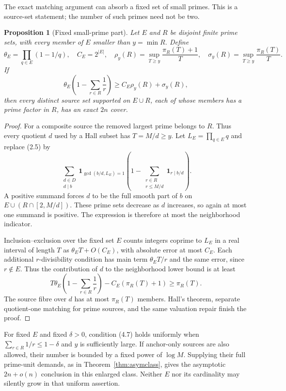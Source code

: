 \documentclass[11pt,a4paper]{article}
\newtheorem{proposition}[theorem]{Proposition}
\theoremstyle{remark}
\newcommand{\ind}{\mathbf 1}
\begin{document}
The exact matching argument can absorb a fixed set of small primes.
This is a source-set statement; the number of such primes need not
be two.

\begin{proposition}[Fixed small-prime part]
\label{prop:fixedanchors}
Let \(E\) and \(R\) be disjoint finite prime sets, with every member
of \(E\) smaller than \(y=\min R\). Define
\[
 \theta_E=\prod_{q\in E}(1-1/q),\quad C_E=2^{|E|},\quad
 \rho_y(R)=\sup_{T\ge y}\frac{\pi_R(T)+1}{T},\quad
 \sigma_y(R)=\sup_{T\ge y}\frac{\pi_R(T)}{T}.
 \]
If
\[
 \theta_E\left(1-\sum_{r\in R}\frac1r\right)
 \ge C_E\rho_y(R)+\sigma_y(R),
 \tag{4.7}
\]
then every distinct source set supported on \(E\cup R\), each of whose
members has a prime factor in \(R\), has an exact \(2n\) cover.
\end{proposition}
\begin{proof}
For a composite source the removed largest prime belongs to \(R\).
Thus every quotient \(d\) used by a Hall subset has \(T=M/d\ge y\).
Let \(L_E=\prod_{q\in E}q\) and replace (2.5) by
\[
 \sum_{\substack{d\in D\\d\mid b}}
 \ind_{\gcd(b/d,L_E)=1}
 \left(1-\sum_{\substack{r\in R\\r\le M/d}}\ind_{r\mid b/d}\right).
 \tag{4.8}
\]
A positive summand forces \(d\) to be the full smooth part of \(b\)
on \(E\cup(R\cap[2,M/d])\). These prime sets decrease as \(d\)
increases, so again at most one summand is positive.
The expression is therefore at most the neighborhood indicator.

Inclusion--exclusion over the fixed set \(E\) counts integers
coprime to \(L_E\) in a real interval of length \(T\) as
\(\theta_ET+O(C_E)\), with absolute error at most \(C_E\).
Each additional \(r\)-divisibility condition has main term
\(\theta_ET/r\) and the same error, since \(r\notin E\).
Thus the contribution of \(d\) to the neighborhood lower bound
is at least
\[
 T\theta_E\left(1-\sum_{r\in R}\frac1r\right)
 -C_E(\pi_R(T)+1)\ge\pi_R(T).
 \]
The source fibre over \(d\) has at most \(\pi_R(T)\) members.
Hall's theorem, separate quotient-one matching for prime sources,
and the same valuation repair finish the proof.
\end{proof}

For fixed \(E\) and fixed \(\delta>0\), condition (4.7) holds uniformly
when \(\sum_{r\in R}1/r\le1-\delta\) and \(y\) is sufficiently large.
If anchor-only sources are also allowed, their number is bounded
by a fixed power of \(\log M\). Supplying their full prime-unit demands,
as in Theorem~\ref{thm:asymclass}, gives the asymptotic \(2n+o(n)\)
conclusion in this enlarged class. Neither \(E\) nor its cardinality
may silently grow in that uniform assertion.
\end{document}
